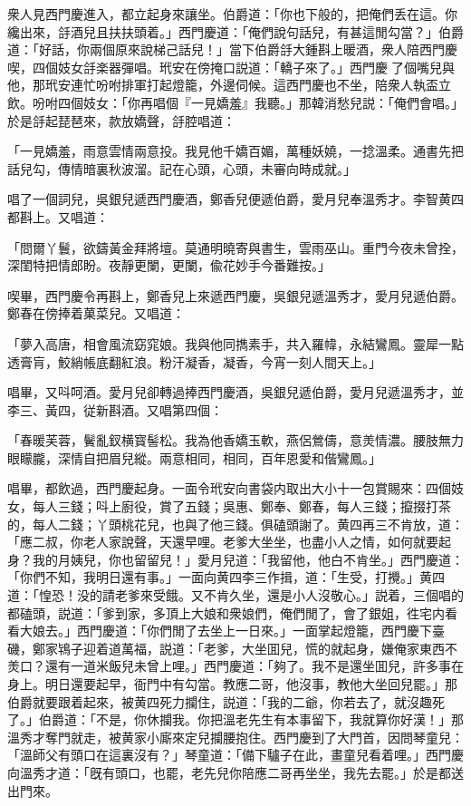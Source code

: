 衆人見西門慶進入，都立起身來讓坐。伯爵道：「你也下般的，把俺們丢在這。你纔出來，㧱酒兒且扶扶頭着。」西門慶道：「俺們說句話兒，有甚這閒勾當？」伯爵道：「好話，你兩個原來說梯己話兒！」當下伯爵㧱大鍾斟上暖酒，衆人陪西門慶喫，四個妓女㧱楽器彈唱。玳安在傍掩口説道：「轎子來了。」西門慶𢫓了個嘴兒與他，那玳安連忙吩咐排軍打起燈籠，外邊伺候。這西門慶也不坐，陪衆人執盃立飲。吩咐四個妓女：「你再唱個『一見嬌羞』我聽。」那韓消愁兒説：「俺們會唱。」於是㧱起琵琶來，款放嬌聲，㧱腔唱道：

\begin{myquote}
「一見嬌羞，雨意雲情兩意投。我見他千嬌百媚，萬種妖嬈，一捻溫柔。通書先把話兒勾，傳情暗裏秋波溜。記在心頭，心頭，未審向時成就。」
\end{myquote}

唱了一個詞兒，吳銀兒遞西門慶酒，鄭香兒便遞伯爵，愛月兒奉溫秀才。李智黄四都斟上。又唱道：

\begin{myquote}
「問爾丫鬟，欲鑄黃金拜將壇。莫通明曉寄與書生，雲雨巫山。重門今夜未曾拴，深閨特把情郎盼。夜靜更闌，更闌，偸花妙手今番難按。」
\end{myquote}

喫畢，西門慶令再斟上，鄭香兒上來遞西門慶，吳銀兒遞溫秀才，愛月兒遞伯爵。鄭春在傍捧着菓菜兒。又唱道：

\begin{myquote}
「夢入高唐，相會風流窈窕娘。我與他同擕素手，共入羅幃，永結鸞鳳。靈犀一點透膏肓，鮫綃帳底翻紅浪。粉汗凝香，凝香，今宵一刻人間天上。」
\end{myquote}

唱畢，又呌呵酒。愛月兒卻轉過捧西門慶酒，吳銀兒遞伯爵，愛月兒遞溫秀才，並李三、黃四，従新斟酒。又唱第四個：

\begin{myquote}
「春暖芙蓉，鬢亂釵横寳髻松。我為他香嬌玉軟，燕侶鶯儔，意羙情濃。腰肢無力眼矇朧，深情自把眉兒縱。兩意相同，相同，百年恩愛和偕鸞鳳。」
\end{myquote}

唱畢，都飲過，西門慶起身。一面令玳安向書袋内取出大小十一包賞賜來：四個妓女，每人三錢；呌上廚役，賞了五錢；吳惠、鄭奉、鄭春，每人三錢；攛掇打茶的，每人二錢；丫頭桃花兒，也與了他三錢。俱磕頭謝了。黄四再三不肯放，道：「應二叔，你老人家說聲，天還早哩。老爹大坐坐，也盡小人之情，如何就要起身？我的月姨兒，你也留留兒！」愛月兒道：「我留他，他白不肯坐。」西門慶道：「你們不知，我明日還有事。」一面向黄四李三作揖，道：「生受，打攪。」黄四道：「惶恐！没的請老爹來受餓。又不肯久坐，還是小人沒敬心。」説着，三個唱的都磕頭，説道：「爹到家，多頂上大娘和衆娘們，俺們閒了，會了銀姐，徃宅内看看大娘去。」西門慶道：「你們閒了去坐上一日來。」一面掌起燈籠，西門慶下臺磯，鄭家鴇子迎着道萬福，説道：「老爹，大坐囬兒，慌的就起身，嫌俺家東西不羙口？還有一道米飯兒未曾上哩。」西門慶道：「夠了。我不是還坐囬兒，許多事在身上。明日還要起早，衙門中有勾當。教應二哥，他沒事，教他大坐回兒罷。」那伯爵就要跟着起來，被黄四死力攔住，説道：「我的二爺，你若去了，就沒趣死了。」伯爵道：「不是，你休攔我。你把溫老先生有本事留下，我就算你好漢！」那溫秀才奪門就走，被黄家小廝來定兒攔腰抱住。西門慶到了大門首，因問琴童兒：「溫師父有頭口在這裏沒有？」琴童道：「備下驢子在此，畫童兒看着哩。」西門慶向溫秀才道：「旣有頭口，也罷，老先兒你陪應二哥再坐坐，我先去罷。」於是都送出門來。

